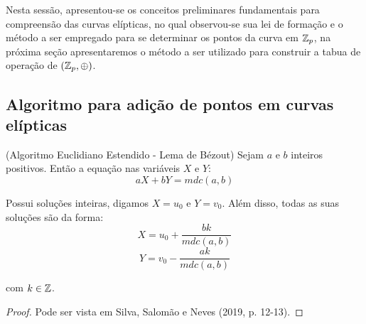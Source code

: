 Nesta sessão, apresentou-se os conceitos preliminares fundamentais para
compreensão das curvas elípticas, no qual observou-se sua lei de formação e o
método a ser empregado para se determinar os pontos da curva em $\mathbb{Z}_{p}$, na
próxima seção apresentaremos o método a ser utilizado para construir a tabua de
operação de $(\mathbb{Z}_{p}, \oplus)$.

\subsection{Algoritmo para adição de pontos em curvas elípticas}

\begin{teorema}\label{teorema:4d1e8442-1093-47f1-99d2-4b4f3c7f0b58}

	(Algoritmo Euclidiano Estendido - Lema de Bézout) Sejam $a$ e $b$ inteiros positivos.
	Então a equação nas variáveis $X$ e $Y$:
	\begin{equation} \label{equation:de2e5ccc-7b0a-4e0a-a9bd-9c6eb48e83c1}
		aX + bY = mdc(a, b)
	\end{equation}

	\justify
	Possui soluções inteiras, digamos $X = u_0$ e $Y = v_0$. Além disso, todas as
	suas soluções são da forma:
	\begin{equation}
		X = u_0 + \frac{bk}{mdc(a, b)} \label{equation:446a68d6-401a-4e3a-abd9-2cd8ff56c1d5}
	\end{equation}
	\begin{equation}
		Y = v_0 - \frac{ak}{mdc(a, b)} \label{equation:4077b258-6707-47ca-9bd9-41b5a5d3ed88}
	\end{equation}

	\justify
	com $k \in \mathbb{Z}$.

\end{teorema}

\begin{proof}
	Pode ser vista em Silva, Salomão e Neves (2019, p. 12-13).
\end{proof}

